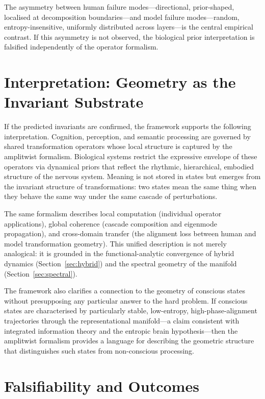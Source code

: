 \documentclass[12pt, a4paper]{article}
\theoremstyle{remark}
\theoremstyle{definition}
\begin{document}
The asymmetry between human failure modes---directional, prior-shaped, localised at
decomposition boundaries---and model failure modes---random, entropy-insensitive, uniformly
distributed across layers---is the central empirical contrast.  If this asymmetry is not
observed, the biological prior interpretation is falsified independently of the operator
formalism.

\section{Interpretation: Geometry as the Invariant Substrate}
\label{sec:interpretation}

If the predicted invariants are confirmed, the framework supports the following
interpretation.  Cognition, perception, and semantic processing are governed by shared
transformation operators whose local structure is captured by the amplitwist formalism.
Biological systems restrict the expressive envelope of these operators via dynamical priors
that reflect the rhythmic, hierarchical, embodied structure of the nervous system.  Meaning
is not stored in states but emerges from the invariant structure of transformations: two
states mean the same thing when they behave the same way under the same cascade of
perturbations.

The same formalism describes local computation (individual operator applications), global
coherence (cascade composition and eigenmode propagation), and cross-domain transfer (the
alignment loss between human and model transformation geometry).  This unified description
is not merely analogical: it is grounded in the functional-analytic convergence of hybrid
dynamics (Section~\ref{sec:hybrid}) and the spectral geometry of the manifold
(Section~\ref{sec:spectral}).

The framework also clarifies a connection to the geometry of conscious states without
presupposing any particular answer to the hard problem.  If conscious states are
characterised by particularly stable, low-entropy, high-phase-alignment trajectories
through the representational manifold---a claim consistent with integrated information
theory and the entropic brain hypothesis---then the amplitwist formalism provides a
language for describing the geometric structure that distinguishes such states from
non-conscious processing.

\section{Falsifiability and Outcomes}
\label{sec:falsifiability}
\end{document}
